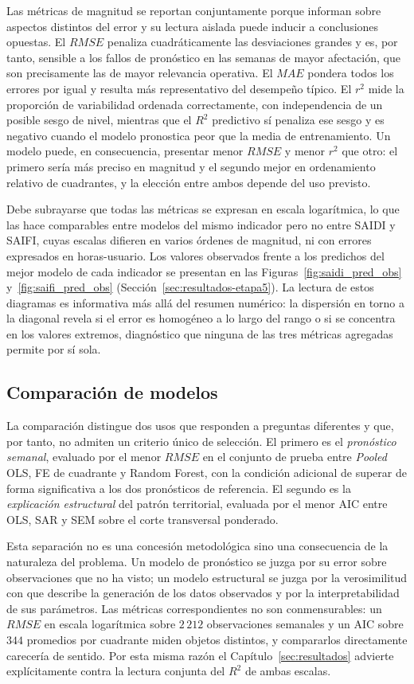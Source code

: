 Las métricas de magnitud se reportan conjuntamente porque informan sobre aspectos distintos del error y su lectura aislada puede inducir a conclusiones opuestas. El $RMSE$ penaliza cuadráticamente las desviaciones grandes y es, por tanto, sensible a los fallos de pronóstico en las semanas de mayor afectación, que son precisamente las de mayor relevancia operativa. El $MAE$ pondera todos los errores por igual y resulta más representativo del desempeño típico. El $r^2$ mide la proporción de variabilidad ordenada correctamente, con independencia de un posible sesgo de nivel, mientras que el $R^2$ predictivo sí penaliza ese sesgo y es negativo cuando el modelo pronostica peor que la media de entrenamiento. Un modelo puede, en consecuencia, presentar menor $RMSE$ y menor $r^2$ que otro: el primero sería más preciso en magnitud y el segundo mejor en ordenamiento relativo de cuadrantes, y la elección entre ambos depende del uso previsto.

Debe subrayarse que todas las métricas se expresan en escala logarítmica, lo que las hace comparables entre modelos del mismo indicador pero no entre SAIDI y SAIFI, cuyas escalas difieren en varios órdenes de magnitud, ni con errores expresados en horas-usuario. Los valores observados frente a los predichos del mejor modelo de cada indicador se presentan en las Figuras~\ref{fig:saidi_pred_obs} y~\ref{fig:saifi_pred_obs} (Sección~\ref{sec:resultados-etapa5}). La lectura de estos diagramas es informativa más allá del resumen numérico: la dispersión en torno a la diagonal revela si el error es homogéneo a lo largo del rango o si se concentra en los valores extremos, diagnóstico que ninguna de las tres métricas agregadas permite por sí sola.

\subsection{Comparación de modelos}
\label{sec:comparacion_modelos}
La comparación distingue dos usos que responden a preguntas diferentes y que, por tanto, no admiten un criterio único de selección. El primero es el \textit{pronóstico semanal}, evaluado por el menor $RMSE$ en el conjunto de prueba entre \emph{Pooled} OLS, FE de cuadrante y Random Forest, con la condición adicional de superar de forma significativa a los dos pronósticos de referencia. El segundo es la \textit{explicación estructural} del patrón territorial, evaluada por el menor AIC entre OLS, SAR y SEM sobre el corte transversal ponderado.

Esta separación no es una concesión metodológica sino una consecuencia de la naturaleza del problema. Un modelo de pronóstico se juzga por su error sobre observaciones que no ha visto; un modelo estructural se juzga por la verosimilitud con que describe la generación de los datos observados y por la interpretabilidad de sus parámetros. Las métricas correspondientes no son conmensurables: un $RMSE$ en escala logarítmica sobre $2\,212$ observaciones semanales y un AIC sobre $344$ promedios por cuadrante miden objetos distintos, y compararlos directamente carecería de sentido. Por esta misma razón el Capítulo~\ref{sec:resultados} advierte explícitamente contra la lectura conjunta del $R^2$ de ambas escalas.

